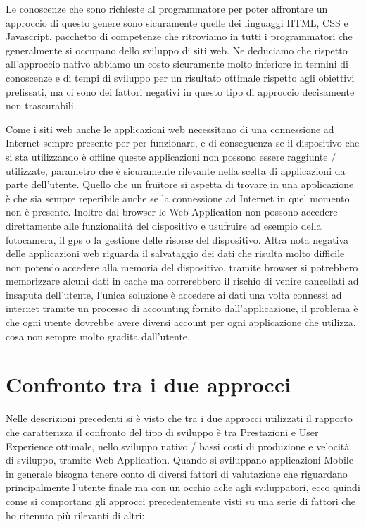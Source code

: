 Le conoscenze che sono richieste al programmatore per poter affrontare un approccio di questo genere sono sicuramente quelle dei linguaggi HTML, CSS e Javascript, pacchetto di competenze che ritroviamo in tutti i programmatori che generalmente si occupano dello sviluppo di siti web. Ne deduciamo che rispetto all'approccio nativo abbiamo un costo sicuramente molto inferiore in termini di conoscenze e di tempi di sviluppo per un risultato ottimale rispetto agli obiettivi prefissati, ma ci sono dei fattori negativi in questo tipo di approccio decisamente non trascurabili.

Come i siti web anche le applicazioni web necessitano di una connessione ad Internet sempre presente per per funzionare, e di conseguenza se il dispositivo che si sta utilizzando è offline queste applicazioni non possono essere raggiunte / utilizzate, parametro che è sicuramente rilevante nella scelta di applicazioni da parte dell'utente. Quello che un fruitore si aspetta di trovare in una applicazione è che sia sempre reperibile anche se la connessione ad Internet in quel momento non è presente. Inoltre dal browser le	 Web Application non possono accedere direttamente alle funzionalità del dispositivo e usufruire ad esempio della fotocamera, il gps o la gestione delle risorse del dispositivo. Altra nota negativa delle applicazioni web riguarda il salvataggio dei dati che risulta molto difficile non potendo accedere alla memoria del dispositivo, tramite browser si potrebbero memorizzare alcuni dati in cache ma correrebbero il rischio di venire cancellati ad insaputa dell'utente, l'unica soluzione è accedere ai dati una volta connessi ad internet tramite un processo di accounting fornito dall'applicazione, il problema è che ogni utente dovrebbe avere diversi account per ogni applicazione che utilizza, cosa non sempre molto gradita dall'utente.

\section{Confronto tra i due approcci}

Nelle descrizioni precedenti si è visto che tra i due approcci utilizzati il rapporto che caratterizza il confronto del tipo di sviluppo è tra Prestazioni e User Experience ottimale, nello sviluppo nativo / bassi costi di produzione e velocità di sviluppo, tramite Web Application. Quando si sviluppano applicazioni Mobile in generale bisogna tenere conto di diversi fattori di valutazione che riguardano principalmente l'utente finale ma con un occhio ache agli sviluppatori, ecco quindi come si comportano gli approcci precedentemente visti su una serie di fattori che ho ritenuto più rilevanti di altri:

